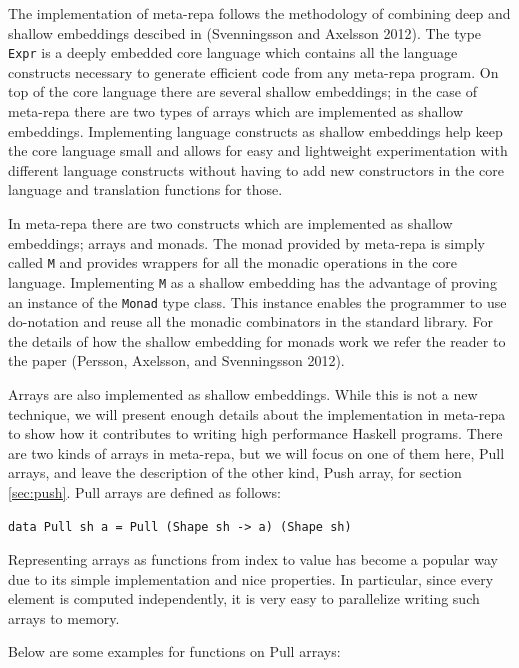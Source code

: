 \documentclass[preprint]{sigplanconf}
\begin{document}
\label{sec:shallow}

The implementation of meta-repa follows the methodology of combining
deep and shallow embeddings descibed in (Svenningsson and Axelsson
2012). The type \texttt{Expr} is a deeply embedded core language which
contains all the language constructs necessary to generate efficient
code from any meta-repa program. On top of the core language there are
several shallow embeddings; in the case of meta-repa there are two types
of arrays which are implemented as shallow embeddings. Implementing
language constructs as shallow embeddings help keep the core language
small and allows for easy and lightweight experimentation with different
language constructs without having to add new constructors in the core
language and translation functions for those.

In meta-repa there are two constructs which are implemented as shallow
embeddings; arrays and monads. The monad provided by meta-repa is simply
called \texttt{M} and provides wrappers for all the monadic operations
in the core language. Implementing \texttt{M} as a shallow embedding has
the advantage of proving an instance of the \texttt{Monad} type class.
This instance enables the programmer to use do-notation and reuse all
the monadic combinators in the standard library. For the details of how
the shallow embedding for monads work we refer the reader to the paper
(Persson, Axelsson, and Svenningsson 2012).

Arrays are also implemented as shallow embeddings. While this is not a
new technique, we will present enough details about the implementation
in meta-repa to show how it contributes to writing high performance
Haskell programs. There are two kinds of arrays in meta-repa, but we
will focus on one of them here, Pull arrays, and leave the description
of the other kind, Push array, for section \ref{sec:push}. Pull arrays
are defined as follows:

\begin{verbatim}
data Pull sh a = Pull (Shape sh -> a) (Shape sh)
\end{verbatim}

Representing arrays as functions from index to value has become a
popular way due to its simple implementation and nice properties. In
particular, since every element is computed independently, it is very
easy to parallelize writing such arrays to memory.

Below are some examples for functions on Pull arrays:
\end{document}
